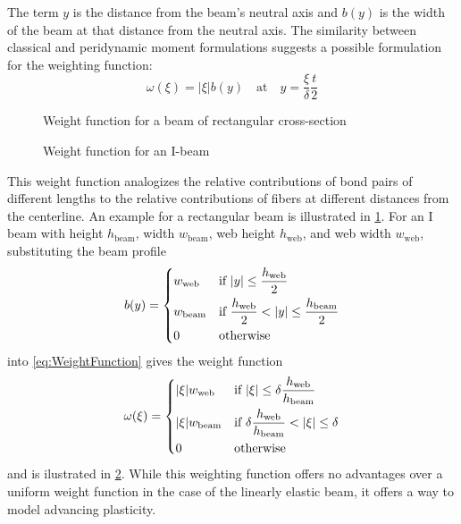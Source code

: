 %
The term \(y\) is the distance from the beam's neutral axis and \(b(y)\) is the width of the beam at that distance from the neutral axis. 
The similarity between classical and peridynamic moment formulations suggests a possible formulation for the weighting function:
%
\begin{equation}
\label{eq:WeightFunction}
\omega(\xi) = |\xi| b\left(y\right) \quad \text{at} \quad y=\frac{\xi}{\delta} \frac{t}{2}
\end{equation}
%
\begin{figure}[h]
 \centering
\caption{Weight function for a beam of rectangular cross-section}
\label{fig:WeightProfileUniform}
\end{figure}

\begin{figure}
  \centering
\caption{Weight function for an I-beam}
\label{fig:WeightProfileIbeam}
\end{figure}
%
This weight function analogizes the relative contributions of bond pairs of different lengths to the relative contributions of fibers at different distances from the centerline. 
An example for a rectangular beam is illustrated in \cref{fig:WeightProfileUniform}.
For an I beam with height \(h_\text{beam}\), width \(w_\text{beam}\), web height \(h_\text{web}\), and web width \(w_\text{web}\), substituting the beam profile
\begin{equation}
b(y) = 
  \begin{dcases}
    w_\text{web} & \text{if } |y| \leq \frac{h_\text{web}}{2} \\
    w_\text{beam} & \text{if } \frac{h_\text{web}}{2} < |y| \leq \frac{h_\text{beam}}{2} \\
    0 &\text{otherwise}
  \end{dcases}\notag
\end{equation}
into \cref{eq:WeightFunction} gives the weight function
\begin{equation}
\omega(\xi) = 
  \begin{dcases}
    |\xi| w_\text{web}& \text{if } |\xi| \leq \delta\frac{h_\text{web}}{h_\text{beam}} \\
    |\xi| w_\text{beam} & \text{if } \delta\frac{h_\text{web}}{h_\text{beam}} < |\xi| \leq \delta \\
    0 &\text{otherwise}
  \end{dcases}\notag
\end{equation}
and is ilustrated in \cref{fig:WeightProfileIbeam}.
    While this weighting function offers no advantages over a uniform weight function in the case of the linearly elastic beam, it offers a way to model advancing plasticity.

